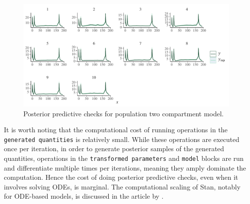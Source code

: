 \begin{figure}
  \begin{center}
  \includegraphics[width=6in]{../figures/twocpt_pop_ppc_4x8.pdf}
  \end{center}
  \caption{Posterior predictive checks for population two compartment model.}
  \label{fig:twoCptPop_ppc}
\end{figure}

It is worth noting that the computational cost of running operations in the \texttt{generated quantities} is relatively small.
While these operations are executed once per iteration, in order to generate posterior samples of the generated quantities, operations in the \texttt{transformed parameters} and \texttt{model} blocks are run and differentiate multiple times per iterations, meaning they amply dominate the computation.
Hence the cost of doing posterior predictive checks, even when it involves solving ODEs, is marginal.
The computational scaling of Stan, notably for ODE-based models, is discussed in the article by \citet{Grinsztajn:2021}.
